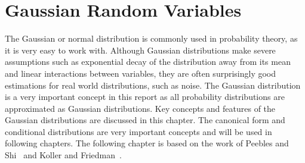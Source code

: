 \documentclass[12pt,oneside,openany,a4paper, %
afrikaans,english,
]{memoir}
\numberwithin{equation}{chapter}
\begin{document}
\chapter{Gaussian Random Variables}
The Gaussian or normal distribution is commonly used in probability theory, as it is very easy to work with. Although Gaussian distributions make severe assumptions such as exponential decay of the distribution away from its mean and linear interactions between variables, they are often surprisingly good estimations for real world distributions, such as noise. The Gaussian distribution is a very important concept in this report as all probability distributions are approximated as Gaussian distributions. Key concepts and features of the Gaussian distributions are discussed in this chapter. The canonical form and conditional distributions are very important concepts and will be used in following chapters. The following chapter is based on the work of Peebles and Shi~\cite{peebles} and Koller and Friedman~\cite{koller}.
\end{document}
